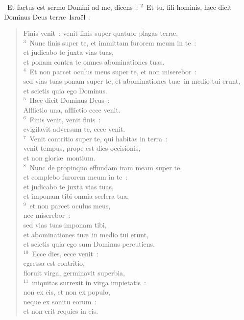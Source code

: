 ~Et factus est sermo Domini ad me, dicens~:
${}^{2}$~Et tu, fili hominis, h\ae c dicit Dominus Deus terr\ae\ Isra\"el~: \begin{flushleft}\begin{verse}Finis venit~: venit finis super quatuor plagas terr\ae .\\
${}^{3}$~Nunc finis super te, et immittam furorem meum in te~:\\ et judicabo te juxta vias tuas,\\ et ponam contra te omnes abominationes tuas.\\
${}^{4}$~Et non parcet oculus meus super te, et non miserebor~:\\ sed vias tuas ponam super te, et abominationes tu\ae\ in medio tui erunt,\\ et scietis quia ego Dominus.\\
${}^{5}$~H\ae c dicit Dominus Deus~:\\ Afflictio una, afflictio ecce venit.\\
${}^{6}$~Finis venit, venit finis~:\\ evigilavit adversum te, ecce venit.\\
${}^{7}$~Venit contritio super te, qui habitas in terra~:\\ venit tempus, prope est dies occisionis,\\ et non glori\ae\ montium.\\
${}^{8}$~Nunc de propinquo effundam iram meam super te,\\ et complebo furorem meum in te~:\\ et judicabo te juxta vias tuas,\\ et imponam tibi omnia scelera tua,\\
${}^{9}$~et non parcet oculus meus,\\ nec miserebor~:\\ sed vias tuas imponam tibi,\\ et abominationes tu\ae\ in medio tui erunt,\\ et scietis quia ego sum Dominus percutiens.\\
${}^{10}$~Ecce dies, ecce venit~:\\ egressa est contritio,\\ floruit virga, germinavit superbia,\\
${}^{11}$~iniquitas surrexit in virga impietatis~:\\ non ex eis, et non ex populo,\\ neque ex sonitu eorum~:\\ et non erit requies in eis.\\

\end{verse}
\end{flushleft}
